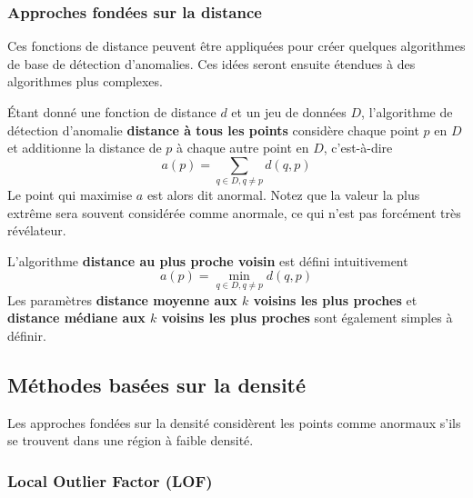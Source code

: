 \subsubsection*{Approches fondées sur la distance}

Ces fonctions de distance peuvent être appliquées pour créer quelques algorithmes de base de détection d'anomalies.
Ces idées seront ensuite étendues à des algorithmes plus complexes.

Étant donné une fonction de distance $d$ et un jeu de données $D$, 
l'algorithme de détection d'anomalie \textbf{distance à tous les points} considère chaque point $p$ en $D$ et additionne la distance de $p$ à chaque autre point en $D$, c'est-à-dire
\[
a(p) 
= \sum_{q \in D, q \not= p} d(q, p)
\]
Le point qui maximise $a$ est alors dit anormal.
Notez que la valeur la plus extrême sera souvent considérée comme anormale, ce qui n'est pas forcément très révélateur.

L'algorithme \textbf{distance au plus proche voisin} est défini intuitivement
\[
a(p) 
= \min_{q \in D, q \not= p} d(q, p)
\]
Les paramètres \textbf{distance moyenne aux $k$ voisins les plus proches} et \textbf{distance médiane aux $k$ voisins les plus proches} sont également simples à définir.

\subsection{Méthodes basées sur la densité} %

Les approches fondées sur la densité considèrent les points comme anormaux s'ils se trouvent dans une région à faible densité.

\subsubsection*{Local Outlier Factor (LOF)} %

